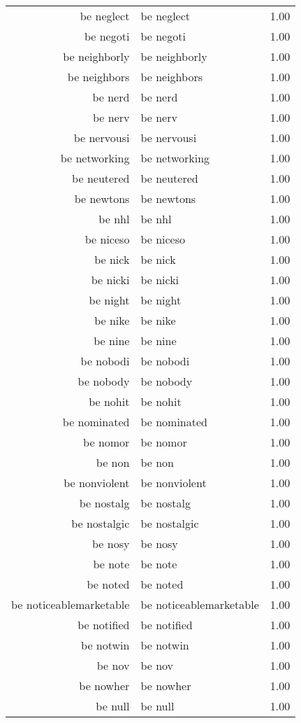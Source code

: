 \begin{table}[ht]
\begin{tabular}{rlr}
  be neglect & be neglect & 1.00 \\ 
  be negoti & be negoti & 1.00 \\ 
  be neighborly & be neighborly & 1.00 \\ 
  be neighbors & be neighbors & 1.00 \\ 
  be nerd & be nerd & 1.00 \\ 
  be nerv & be nerv & 1.00 \\ 
  be nervousi & be nervousi & 1.00 \\ 
  be networking & be networking & 1.00 \\ 
  be neutered & be neutered & 1.00 \\ 
  be newtons & be newtons & 1.00 \\ 
  be nhl & be nhl & 1.00 \\ 
  be niceso & be niceso & 1.00 \\ 
  be nick & be nick & 1.00 \\ 
  be nicki & be nicki & 1.00 \\ 
  be night & be night & 1.00 \\ 
  be nike & be nike & 1.00 \\ 
  be nine & be nine & 1.00 \\ 
  be nobodi & be nobodi & 1.00 \\ 
  be nobody & be nobody & 1.00 \\ 
  be nohit & be nohit & 1.00 \\ 
  be nominated & be nominated & 1.00 \\ 
  be nomor & be nomor & 1.00 \\ 
  be non & be non & 1.00 \\ 
  be nonviolent & be nonviolent & 1.00 \\ 
  be nostalg & be nostalg & 1.00 \\ 
  be nostalgic & be nostalgic & 1.00 \\ 
  be nosy & be nosy & 1.00 \\ 
  be note & be note & 1.00 \\ 
  be noted & be noted & 1.00 \\ 
  be noticeablemarketable & be noticeablemarketable & 1.00 \\ 
  be notified & be notified & 1.00 \\ 
  be notwin & be notwin & 1.00 \\ 
  be nov & be nov & 1.00 \\ 
  be nowher & be nowher & 1.00 \\ 
  be null & be null & 1.00 \\ 

\end{tabular}
\end{table}
